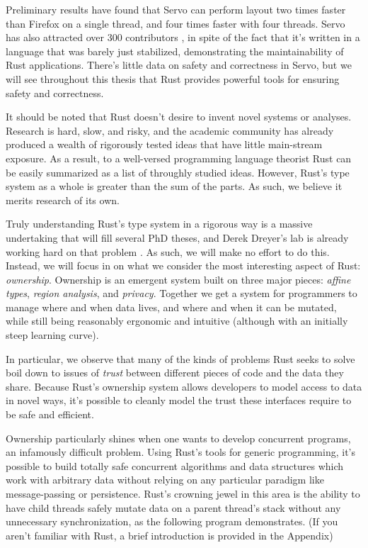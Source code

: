 Preliminary results \cite{servo-exp} have found that Servo can
perform layout two times faster than Firefox on a single thread, and four times
faster with four threads. Servo has also attracted over 300 contributors \cite{servo-gh},
in spite of the fact that it's written in a language that was barely just
stabilized, demonstrating the maintainability of Rust applications. There's
little data on safety and correctness in Servo, but we will see throughout this
thesis that Rust provides powerful tools for ensuring safety and correctness.

It should be noted that Rust doesn't desire to invent novel systems or analyses.
Research is hard, slow, and risky, and the academic community has already produced
a wealth of rigorously tested ideas that have little main-stream exposure. As a
result, to a well-versed programming language theorist Rust can be easily
summarized as a list of throughly studied ideas. However, Rust's type system
as a whole is greater than the sum of the parts. As such, we believe it merits
research of its own.

Truly understanding Rust's type system in a rigorous way is a massive
undertaking that will fill several PhD theses, and Derek Dreyer's lab is already
working hard on that problem \cite{rustbelt}. As such, we will make no effort
to do this. Instead, we will focus in on what we consider the most interesting
aspect of Rust: \emph{ownership}. Ownership is an emergent system built on three
major pieces: \emph{affine types}, \emph{region analysis}, and \emph{privacy}. Together we get
a system for programmers to manage where and when data lives, and where
and when it can be mutated, while still being reasonably ergonomic and intuitive
(although with an initially steep learning curve).

In particular,
we observe that many of the kinds of problems Rust seeks to solve boil down
to issues of \emph{trust} between different pieces of code and the data they share.
Because Rust's ownership system allows developers to model access to data in
novel ways, it's possible to cleanly model the trust these interfaces require to be
safe and efficient.

Ownership particularly shines when one wants to develop concurrent programs,
an infamously difficult problem. Using Rust's tools for generic programming,
it's possible to build totally safe concurrent algorithms and data structures
which work with arbitrary data without relying on any particular paradigm like
message-passing or persistence. Rust's crowning jewel in this area is the
ability to have child threads safely mutate data on a parent thread's stack
without any unnecessary synchronization, as the following program demonstrates.
(If you aren't familiar with Rust, a brief introduction is provided in the Appendix)

